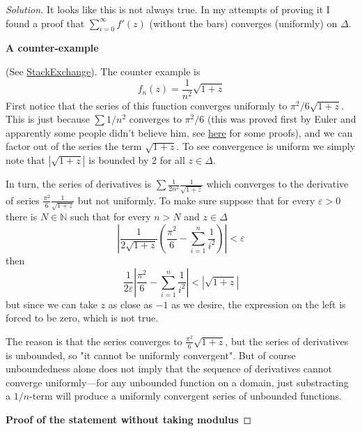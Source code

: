 \begin{proof}[Solution]
	It looks like this is not always true. In my attempts of proving it I found a proof that $\sum_{i=0}^\infty f'(z)$ (without the bars) converges (uniformly) on $ \Delta$.


\vspace{1em}\textbf{A counter-example}

(See \href{https://math.stackexchange.com/questions/380446/prove-that-a-bounded-analytic-function-in-the-right-half-plane-which-vanishes-at}{StackExchange}). The counter example is
	\[f_n(z)=\frac{1}{n^2}\sqrt{1+z} \]
	First notice that the series of this function converges uniformly to $\pi^2/6\sqrt{1+z}$. This is just because $\sum 1/n^2$ converges to $\pi^2/6$ (this was proved first by Euler and apparently some people didn't believe him, see \href{https://math.stackexchange.com/questions/8337/different-ways-to-prove-sum-k-1-infty-frac1k2-frac-pi26-the-b}{here} for some proofs), and we can factor out of the series the term $\sqrt{1+z}$. To see convergence is uniform we simply note that $|\sqrt{1+z}|$ is bounded by 2 for all $z\in\Delta$.

	In turn, the series of derivatives is $\sum \frac{1}{2n^2}\frac{1}{\sqrt{1+z} }$ which converges to the derivative of series $\frac{\pi^2}{6}\frac{1}{\sqrt{1+z} }$ but not uniformly. To make sure suppose that for every $\varepsilon>0$ there is $N\in\mathbb{N}$ such that for every $n>N$ and  $z\in\Delta$ 
	\[\left| \frac{1}{2\sqrt{1+z} }\left( \frac{\pi^2}{6}-\sum_{i=1}^n\frac{1}{i^2} \right)  \right| <\varepsilon\]
	then
	\[\frac{1}{2\varepsilon}\left| \frac{\pi^2}{6}-\sum_{i=1}^n\frac{1}{i^2} \right|<|\sqrt{1+z} | \]
	but since we can take $z$ as close as $-1$ as we desire, the expression on the left is forced to be zero, which is not true.

	The reason is that the series converges to $\frac{\pi^2}{6}\sqrt{1+z} $, but the series of derivatives is unbounded, so "it cannot be uniformly convergent". But of course unboundedness alone does not imply that the sequence of derivatives cannot converge uniformly---for any unbounded function on a domain, just substracting a $1/n$-term will produce a uniformly convergent series of unbounded functions.
\vspace{1em}

\textbf{Proof of the statement without taking modulus}


\end{proof}
